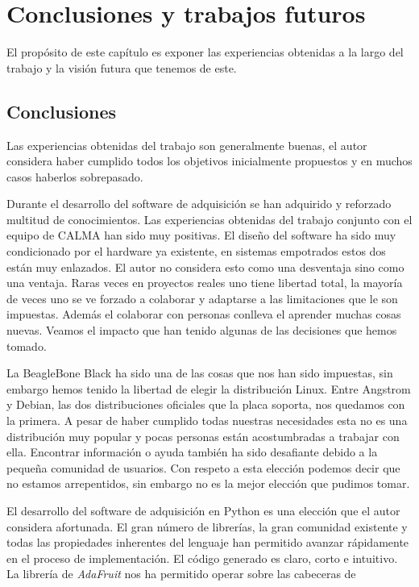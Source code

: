 \chapter{Conclusiones y trabajos futuros}
\label{cap_conclusiones}
El propósito de este capítulo es exponer las experiencias obtenidas a la largo del trabajo y la visión futura que tenemos de este.

\section{Conclusiones}
	Las experiencias obtenidas del trabajo son generalmente buenas, el autor considera haber cumplido todos los objetivos inicialmente propuestos
	y en muchos casos haberlos sobrepasado. 
	\par
	Durante el desarrollo del software de adquisición se han adquirido y reforzado multitud de conocimientos. Las experiencias obtenidas del
	trabajo conjunto con el equipo de CALMA han sido muy positivas. El diseño del software ha sido muy condicionado por el hardware ya existente,
	en sistemas empotrados estos dos están muy enlazados. El autor no considera esto como una desventaja sino como una ventaja. Raras veces en
	proyectos reales uno tiene libertad total, la mayoría de veces uno se ve forzado  a colaborar y adaptarse a las limitaciones que le son
	impuestas. Además el colaborar con personas conlleva el aprender muchas cosas nuevas. Veamos el impacto que han tenido algunas de las
	decisiones que hemos tomado.
	\par
	La BeagleBone Black ha sido una de las cosas que nos han sido impuestas, sin embargo hemos tenido la libertad de elegir la distribución Linux.
	Entre Angstrom y Debian, las dos distribuciones oficiales que la placa soporta, nos quedamos con la primera. A pesar de haber cumplido todas
	nuestras necesidades esta no es una distribución muy popular y pocas personas están acostumbradas a trabajar con ella. Encontrar información o
	ayuda también ha sido desafiante debido a la pequeña comunidad de usuarios. Con respeto a esta elección podemos decir que no estamos
	arrepentidos, sin embargo no es la mejor elección que pudimos tomar. 
	\par
	El desarrollo del software de adquisición en Python es una elección que el autor considera afortunada. El gran número de librerías, la gran
	comunidad existente y todas las propiedades inherentes del lenguaje han permitido avanzar rápidamente en el proceso de implementación. El
	código generado es claro, corto e intuitivo. La librería de \emph{AdaFruit}\cite{AdaFruitGit} nos ha permitido operar sobre las cabeceras de
